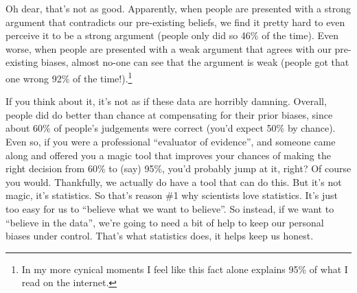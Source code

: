 \documentclass[
  a4paper,
]{book}
\begin{document}
\begin{table}

\caption{\label{tbl-tab1-2}Pre-existing biases and argument validity}

\centering
{}

\end{table}%

Oh dear, that's not as good. Apparently, when people are presented with
a strong argument that contradicts our pre-existing beliefs, we find it
pretty hard to even perceive it to be a strong argument (people only did
so 46\% of the time). Even worse, when people are presented with a weak
argument that agrees with our pre-existing biases, almost no-one can see
that the argument is weak (people got that one wrong 92\% of the
time!).\footnote{In my more cynical moments I feel like this fact alone
  explains 95\% of what I read on the internet.}

\begin{table}

\caption{\label{tbl-tab1-3}Intuition and argument validity}

\centering
{}

\end{table}%

If you think about it, it's not as if these data are horribly damning.
Overall, people did do better than chance at compensating for their
prior biases, since about 60\% of people's judgements were correct
(you'd expect 50\% by chance). Even so, if you were a professional
``evaluator of evidence'', and someone came along and offered you a
magic tool that improves your chances of making the right decision from
60\% to (say) 95\%, you'd probably jump at it, right? Of course you
would. Thankfully, we actually do have a tool that can do this. But it's
not magic, it's statistics. So that's reason \#1 why scientists love
statistics. It's just too easy for us to ``believe what we want to
believe''. So instead, if we want to ``believe in the data'', we're
going to need a bit of help to keep our personal biases under control.
That's what statistics does, it helps keep us honest.
\end{document}
